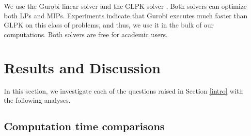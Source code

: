 \documentclass[11pt,onecolumn]{article}
\newcommand{\se}{Section }
\theoremstyle{plain}
\theoremstyle{definition}
\begin{document}
We use the Gurobi linear solver \cite{gurobi} and the GLPK  solver \cite{glpk}. Both solvers can optimize both LPs and MIPs. Experiments indicate that Gurobi executes much faster than GLPK on this class of problems, and thus, we use it in the bulk of our computations. Both solvers are free for academic users. 

 
\section{Results and Discussion}\label{results}

 In this section, we investigate each of the questions raised in \se \ref{intro} with the following analyses.

\subsection{Computation time comparisons} 
\label{sec:timecomparisons}
\end{document}
